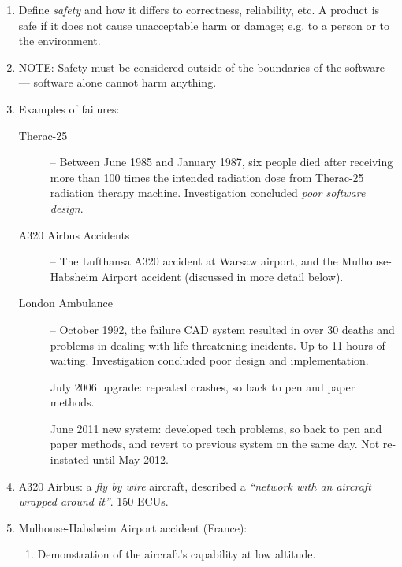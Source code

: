 \documentclass[11pt]{article}
\begin{document}
\begin{enumerate}

 \item Define \emph{safety} and how it differs to correctness, reliability, etc. A product is safe if it does not cause unacceptable harm or damage; e.g. to a person or to the environment.

 \item NOTE: Safety must be considered outside of the boundaries of the software --- software alone cannot harm anything.

 \item Examples of failures:

  \begin{description}

    \item[Therac-25]  -- Between June 1985 and January 1987, six people died after receiving more than 100 times the intended radiation dose from Therac-25 radiation therapy machine. Investigation concluded \emph{poor software design}.

   \item[A320 Airbus Accidents] -- The Lufthansa A320 accident at
      Warsaw airport, and the Mulhouse-Habsheim Airport accident (discussed in more detail below).

    \item[London Ambulance] -- October 1992, the failure CAD system resulted in over 30 deaths and problems in dealing with life-threatening incidents. Up to 11 hours of waiting. Investigation concluded poor design and implementation.

  July 2006 upgrade: repeated crashes, so back to pen and paper methods.

  June 2011 new system: developed tech problems, so back to pen and paper methods, and revert to previous system on the same day. Not re-instated until May 2012.

  \end{description}

 \item  A320 Airbus: a \emph{fly by wire} aircraft, described a \emph{``network with an aircraft wrapped  around it''}. 150 ECUs.

 \item  Mulhouse-Habsheim Airport accident (France):

  \begin{enumerate}

  \item Demonstration of the aircraft's capability at low  altitude.


\end{enumerate}
\end{enumerate}
\end{document}
